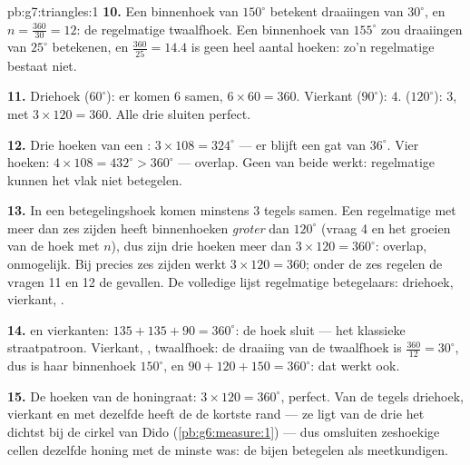\begin{solution}{pb:g7:triangles:1}
\textbf{10.} Een binnenhoek van $150^\circ$ betekent draaiingen van $30^\circ$, en
$n = \frac{360}{30} = 12$: de regelmatige twaalfhoek. Een binnenhoek van $155^\circ$
zou draaiingen van $25^\circ$ betekenen, en $\frac{360}{25} = 14.4$ is geen heel
aantal hoeken: zo'n regelmatige  bestaat niet.

\textbf{11.} Driehoek ($60^\circ$): er komen $6$ samen,
$6 \times 60 = 360$. Vierkant ($90^\circ$): $4$.  ($120^\circ$): $3$, met
$3 \times 120 = 360$. Alle drie sluiten perfect.

\textbf{12.} Drie hoeken van een : $3 \times 108 = 324^\circ$ --- er blijft
een gat van $36^\circ$. Vier hoeken: $4 \times 108 = 432^\circ > 360^\circ$ ---
overlap. Geen van beide werkt: regelmatige  kunnen het vlak niet
betegelen.

\textbf{13.} In een betegelingshoek komen minstens $3$ tegels samen. Een regelmatige
 met meer dan zes zijden heeft binnenhoeken \emph{groter} dan $120^\circ$
(vraag 4 en het groeien van de hoek met $n$), dus zijn drie hoeken meer dan
$3 \times 120 = 360^\circ$: overlap, onmogelijk. Bij precies zes zijden werkt
$3 \times 120 = 360$; onder de zes regelen de vragen 11 en 12 de gevallen. De
volledige lijst regelmatige betegelaars: driehoek, vierkant, .

\textbf{14.}  en vierkanten: $135 + 135 + 90 = 360^\circ$: de hoek sluit
--- het klassieke straatpatroon. Vierkant, , twaalfhoek: de draaiing van de
twaalfhoek is $\frac{360}{12} = 30^\circ$, dus is haar binnenhoek $150^\circ$, en
$90 + 120 + 150 = 360^\circ$: dat werkt ook.

\textbf{15.} De hoeken van de honingraat: $3 \times 120 = 360^\circ$, perfect. Van
de tegels driehoek, vierkant en  met dezelfde  heeft de  de
kortste rand --- ze ligt van de drie het dichtst bij de cirkel van Dido
(\cref{pb:g6:measure:1}) --- dus omsluiten zeshoekige cellen dezelfde honing met de
minste was: de bijen betegelen als meetkundigen.
\end{solution}
